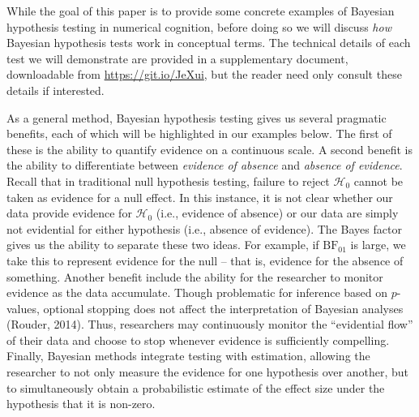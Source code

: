 \documentclass[english,,doc,floatsintext]{apa6}
\begin{document}
While the goal of this paper is to provide some concrete examples of Bayesian hypothesis testing in numerical cognition, before doing so we will discuss \emph{how} Bayesian hypothesis tests work in conceptual terms. The technical details of each test we will demonstrate are provided in a supplementary document, downloadable from \url{https://git.io/JeXui}, but the reader need only consult these details if interested.

As a general method, Bayesian hypothesis testing gives us several pragmatic benefits, each of which will be highlighted in our examples below. The first of these is the ability to quantify evidence on a continuous scale. A second benefit is the ability to differentiate between \emph{evidence of absence} and \emph{absence of evidence}. Recall that in traditional null hypothesis testing, failure to reject \(\mathcal{H}_0\) cannot be taken as evidence for a null effect. In this instance, it is not clear whether our data provide evidence for \(\mathcal{H}_0\) (i.e., evidence of absence) or our data are simply not evidential for either hypothesis (i.e., absence of evidence). The Bayes factor gives us the ability to separate these two ideas. For example, if \(\text{BF}_{01}\) is large, we take this to represent evidence for the null -- that is, evidence for the absence of something. Another benefit include the ability for the researcher to monitor evidence as the data accumulate. Though problematic for inference based on \(p\)-values, optional stopping does not affect the interpretation of Bayesian analyses (Rouder, 2014). Thus, researchers may continuously monitor the \enquote{evidential flow} of their data and choose to stop whenever evidence is sufficiently compelling. Finally, Bayesian methods integrate testing with estimation, allowing the researcher to not only measure the evidence for one hypothesis over another, but to simultaneously obtain a probabilistic estimate of the effect size under the hypothesis that it is non-zero.
\end{document}
